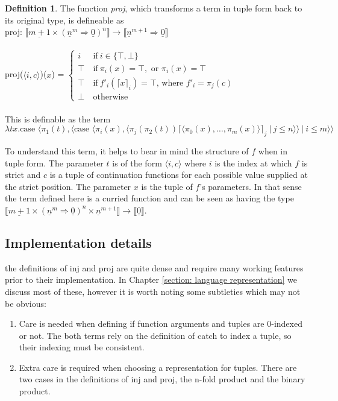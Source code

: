 \documentclass[12pt,a4paper]{report}
\theoremstyle{definition}
\newtheorem{definition}{Definition}[chapter]%
\theoremstyle{remark}
\begin{document}
\begin{definition}
    The function \emph{proj}, which transforms a term in tuple form back to its original type, is defineable as \\
    proj: $\llbracket \underline{m + 1} \times (\underline{n}^{m} \Rightarrow \underline{0})^n \rrbracket \rightarrow \llbracket \underline{n}^{m+1} \Rightarrow \underline{0} \rrbracket$\\\\
    proj($\langle i, c\rangle$)($x$) =
    $\begin{cases}
        i\ &\text{if}\ i \in \{\top, \bot\}\\
        \top\ &\text{if}\ \pi_i(x) = \top, \text{ or } \pi_i(x) = \top\\
        \top\ &\text{if}\ f'_i(\lceil x \rceil_i) = \top \text{, where } f'_i = \pi_j(c)\\
        \bot\ &\text{otherwise}
    \end{cases}$\\\\
    This is definable as the term
    \[
    \lambda tx. \text{case } \langle \pi_1(t), \langle \text{case } \langle \pi_i(x), \langle \pi_j(\pi_2(t)) \lceil \langle \pi_0(x), \dots, \pi_m(x)\rangle\rceil_j\ | \ j \le n \rangle \rangle\ |\ i \leq m \rangle \rangle
    \]
\end{definition}

To understand this term, it helps to bear in mind the structure of $f$ when in tuple form. The parameter $t$ is of the form $\langle i, c\rangle$ where $i$ is the index at which $f$ is strict and $c$ is a tuple of continuation functions for each possible value supplied at the strict position. The parameter $x$ is the tuple of $f$'s parameters. In that sense the term defined here is a curried function and can be seen as having the type $\llbracket \underline{m + 1} \times (\underline{n}^{m} \Rightarrow \underline{0})^n \times \underline{n}^{m+1} \rrbracket \rightarrow \llbracket \underline{0} \rrbracket$.

\subsection{Implementation details}
the definitions of inj and proj are quite dense and require many working features prior to their implementation. In Chapter \ref{section: language representation} we discuss most of these, however it is worth noting some subtleties which may not be obvious:
\begin{enumerate}
    \item Care is needed when defining if function arguments and tuples are 0-indexed or not. The both terms rely on the definition of catch to index a tuple, so their indexing must be consistent.
    \item Extra care is required when choosing a representation for tuples. There are two cases in the definitions of inj and proj, the n-fold product and the binary product. 
\end{enumerate}
\end{document}
